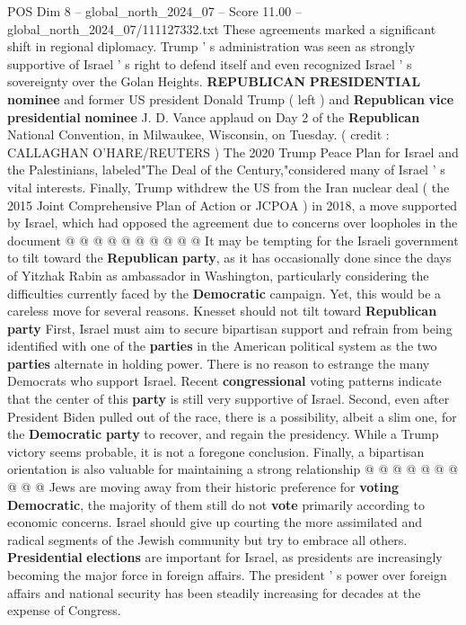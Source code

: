 \begin{textsample}{POS Dim 8 – global\_north\_2024\_07 – Score 11.00 – global\_north\_2024\_07/111127332.txt}
These agreements marked a significant shift in regional diplomacy.
Trump ' s administration was seen as strongly supportive of Israel ' s right to defend itself and even recognized Israel ' s sovereignty over the Golan Heights. \textbf{REPUBLICAN} \textbf{PRESIDENTIAL} \textbf{nominee} and former US president Donald Trump ( left ) and \textbf{Republican} \textbf{vice} \textbf{presidential} \textbf{nominee} J.
D.
Vance applaud on Day 2 of the \textbf{Republican} National Convention, in Milwaukee, Wisconsin, on Tuesday. ( credit : CALLAGHAN O'HARE/REUTERS ) The 2020 Trump Peace Plan for Israel and the Palestinians, labeled"The Deal of the Century,"considered many of Israel ' s vital interests.
Finally, Trump withdrew the US from the Iran nuclear deal ( the 2015 Joint Comprehensive Plan of Action or JCPOA ) in 2018, a move supported by Israel, which had opposed the agreement due to concerns over loopholes in the document @ @ @ @ @ @ @ @ @ @ It may be tempting for the Israeli government to tilt toward the \textbf{Republican} \textbf{party}, as it has occasionally done since the days of Yitzhak Rabin as ambassador in Washington, particularly considering the difficulties currently faced by the \textbf{Democratic} campaign.
Yet, this would be a careless move for several reasons.
Knesset should not tilt toward \textbf{Republican} \textbf{party} First, Israel must aim to secure bipartisan support and refrain from being identified with one of the \textbf{parties} in the American political system as the two \textbf{parties} alternate in holding power.
There is no reason to estrange the many Democrats who support Israel.
Recent \textbf{congressional} voting patterns indicate that the center of this \textbf{party} is still very supportive of Israel.
Second, even after President Biden pulled out of the race, there is a possibility, albeit a slim one, for the \textbf{Democratic} \textbf{party} to recover, and regain the presidency.
While a Trump victory seems probable, it is not a foregone conclusion.
Finally, a bipartisan orientation is also valuable for maintaining a strong relationship @ @ @ @ @ @ @ @ @ @ Jews are moving away from their historic preference for \textbf{voting} \textbf{Democratic}, the majority of them still do not \textbf{vote} primarily according to economic concerns.
Israel should give up courting the more assimilated and radical segments of the Jewish community but try to embrace all others. \textbf{Presidential} \textbf{elections} are important for Israel, as presidents are increasingly becoming the major force in foreign affairs.
The president ' s power over foreign affairs and national security has been steadily increasing for decades at the expense of Congress.

\end{textsample}
